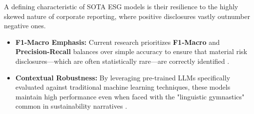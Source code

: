 \documentclass{article}
\begin{document}
A defining characteristic of SOTA ESG models is their resilience to the highly skewed nature of corporate reporting, where positive disclosures vastly outnumber negative ones.
\begin{itemize}
\item 

\textbf{F1-Macro Emphasis:} Current research prioritizes \textbf{F1-Macro} and \textbf{Precision-Recall} balances over simple accuracy to ensure that material risk disclosures—which are often statistically rare—are correctly identified  \parencite[]{yinan_yu_e282fd98, tae_sun_chung_e16a4c18}.\item 

\textbf{Contextual Robustness:} By leveraging pre-trained LLMs specifically evaluated against traditional machine learning techniques, these models maintain high performance even when faced with the "linguistic gymnastics" common in sustainability narratives  \parencite{tae_sun_chung_e16a4c18}.
\end{itemize}
\end{document}
